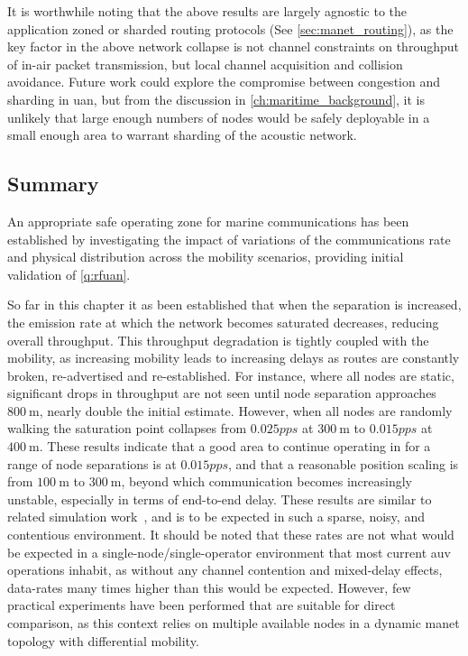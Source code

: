 It is worthwhile noting that the above results are largely agnostic to the application zoned or sharded routing protocols (See \autoref{sec:manet_routing}), as the key factor in the above network collapse is not channel constraints on throughput of in-air packet transmission, but local channel acquisition and collision avoidance.
Future work could explore the compromise between congestion and sharding in \gls{uan}, but from the discussion in \autoref{ch:maritime_background}, it is unlikely that large enough numbers of nodes would be safely deployable in a small enough area to warrant sharding of the acoustic network.

\subsection{Summary}

An appropriate safe operating zone for marine communications has been established by investigating the impact of variations of the communications rate and physical distribution across the mobility scenarios, providing initial validation of \autoref{q:rfuan}.

So far in this chapter it as been established that when the separation is increased, the emission rate at which the network becomes saturated decreases, reducing overall throughput. 
This throughput degradation is tightly coupled with the mobility, as increasing mobility leads to increasing delays as routes are constantly broken, re-advertised and re-established. 
For instance, where all nodes are static, significant drops in throughput are not seen until node separation approaches $\SI{800}{\meter}$, nearly double the initial estimate. 
However, when all nodes are randomly walking the saturation point collapses from $0.025pps$ at $\SI{300}{\meter}$ to $0.015pps$ at $\SI{400}{\meter}$.
These results indicate that a good area to continue operating in for a range of node separations is at $0.015pps$, and that a reasonable position scaling is from $\SI{100}{\meter}$ to $\SI{300}{\meter}$, beyond which communication becomes increasingly unstable, especially in terms of end-to-end delay.
These results are similar to related simulation work~\cite{Miquel2008,Diamant2010,Noh2012}, and is to be expected in such a sparse, noisy, and contentious environment.
It should be noted that these rates are not what would be expected in a single-node/single-operator environment that most current \gls{auv} operations inhabit, as without any channel contention and mixed-delay effects, data-rates many times higher than this would be expected.
However, few practical experiments have been performed that are suitable for direct comparison, as this context relies on multiple available nodes in a dynamic \gls{manet} topology with differential mobility.


